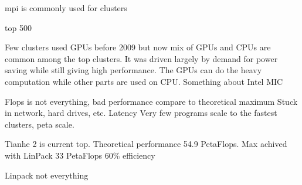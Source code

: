 \documentclass[10pt,a4paper]{report}
\begin{document}
mpi is commonly used for clusters\cite{introduction_hpc_hager}

top 500\cite{TOP500}

Few clusters used GPUs before 2009 but now mix of GPUs and CPUs are common among the top clusters. It was driven largely by demand for power saving while still giving high performance. The GPUs can do the heavy computation while other parts are used on CPU. \cite{introduction_hpc_hager}
Something about Intel MIC

Flops is not everything, bad performance compare to theoretical maximum
Stuck in network, hard drives, etc. Latency
Very few programs scale to the fastest clusters, peta scale.

Tianhe 2 is current top. Theoretical performance 54.9 PetaFlops.\cite{TOP500}
Max achived with LinPack 33 PetaFlops
60\% efficiency

Linpack not everything

\cite{introduction_hpc_hager}

\clearpage
\end{document}
